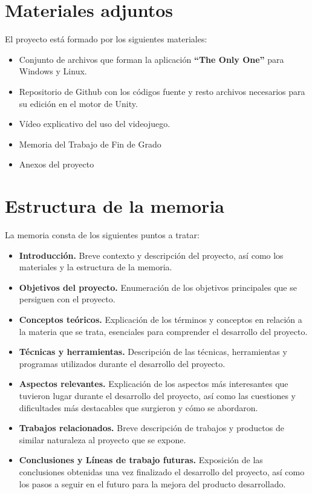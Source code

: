\section{Materiales adjuntos}

El proyecto está formado por los siguientes materiales:
\begin{itemize}
\item Conjunto de archivos que forman la aplicación \textbf{``The Only One''} para Windows y Linux.
\item Repositorio de Github con los códigos fuente y resto archivos necesarios para su edición en el motor de Unity.
\item Vídeo explicativo del uso del videojuego.
\item Memoria del Trabajo de Fin de Grado
\item Anexos del proyecto
\end{itemize}

\section{Estructura de la memoria}

La memoria consta de los siguientes puntos a tratar:
\begin{itemize}
\item \textbf{Introducción.} Breve contexto y descripción del proyecto, así como los materiales y la estructura de la memoria.
\item \textbf{Objetivos del proyecto.} Enumeración de los objetivos principales que se persiguen con el proyecto.
\item \textbf{Conceptos teóricos.} Explicación de los términos y conceptos en relación a la materia que se trata, esenciales para comprender el desarrollo del proyecto.
\item \textbf{Técnicas y herramientas.} Descripción de las técnicas, herramientas y programas utilizados durante el desarrollo del proyecto.
\item \textbf{Aspectos relevantes.} Explicación de los aspectos más interesantes que tuvieron lugar durante el desarrollo del proyecto, así como las cuestiones y dificultades más destacables que surgieron y cómo se abordaron.
\item \textbf{Trabajos relacionados.} Breve descripción de trabajos y productos de similar naturaleza al proyecto que se expone.
\item \textbf{Conclusiones y Líneas de trabajo futuras.} Exposición de las conclusiones obtenidas una vez finalizado el desarrollo del proyecto, así como los pasos a seguir en el futuro para la mejora del producto desarrollado.
\end{itemize}